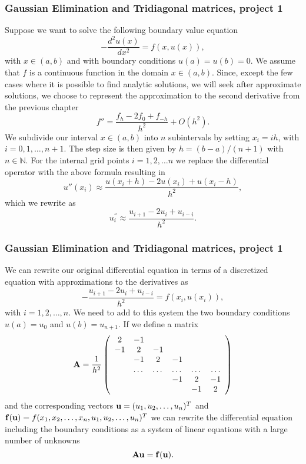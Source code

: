 \documentclass[compress]{beamer}
\begin{document}
\frame
{
  \frametitle{Gaussian Elimination and Tridiagonal matrices, project 1}
\begin{small}
{\scriptsize
Suppose we want to solve the following boundary value equation
\[
  -\frac{d^2u(x)}{dx^2} = f(x,u(x)),
\]
with $x\in (a,b)$ and with boundary conditions $u(a)=u(b) = 0$.
We assume that $f$ is a continuous function in the domain $x\in (a,b)$.
Since, except the few cases where it is possible to find analytic solutions, we
will seek after approximate solutions, we choose to represent the approximation to the second derivative
from the previous chapter
\[
  f''=\frac{f_h -2f_0 +f_{-h}}{h^2} +O(h^2).
\]
We subdivide our interval $x\in (a,b)$ into $n$ subintervals by setting $x_i = ih$, with $i=0,1,\dots,n+1$.
The step size is then given by $h=(b-a)/(n+1)$ with $n\in {\mathbb{N}}$.
For the internal grid points $i=1,2,\dots n$ we replace the differential operator with the above formula
resulting in
\[
u''(x_i) \approx  \frac{u(x_i+h) -2u(x_i) +u(x_i-h)}{h^2},
\]
which we rewrite as
\[
u^{''}_i \approx  \frac{u_{i+1} -2u_i +u_{i-i}}{h^2}.
\]
}
\end{small}
}


\frame
{
  \frametitle{Gaussian Elimination and Tridiagonal matrices, project 1}
\begin{small}
{\scriptsize
We can rewrite our original differential equation in terms of a discretized equation with approximations to the
derivatives as
\[
    -\frac{u_{i+1} -2u_i +u_{i-i}}{h^2}=f(x_i,u(x_i)),
\]
with $i=1,2,\dots, n$. We need to add to this system the two boundary conditions $u(a) =u_0$ and $u(b) = u_{n+1}$.
If we define a matrix
\[
    {\bf A} = \frac{1}{h^2}\left(\begin{array}{cccccc}
                          2 & -1 &  &   &  & \\
                          -1 & 2 & -1 & & & \\
                           & -1 & 2 & -1 & &  \\
                           & \dots   & \dots &\dots   &\dots & \dots \\
                           &   &  &-1  &2& -1 \\
                           &    &  &   &-1 & 2 \\
                      \end{array} \right)
\]
and the corresponding vectors ${\bf u} = (u_1, u_2, \dots,u_n)^T$ and
${\bf f}({\bf u}) = f(x_1,x_2,\dots, x_n,u_1, u_2, \dots,u_n)^T$  we can rewrite the differential equation
including the boundary conditions as a system of linear equations with  a large number of unknowns
\[
   {\bf A}{\bf u} = {\bf f}({\bf u}).
 \]
}
\end{small}
}
\end{document}
